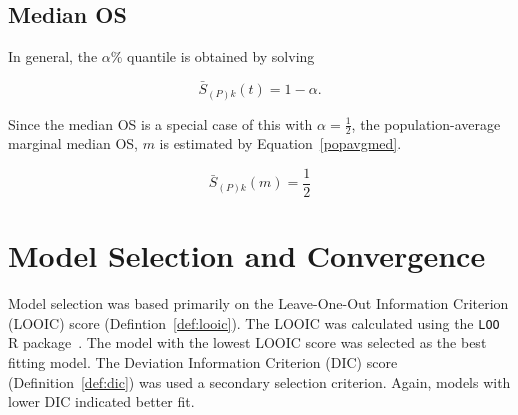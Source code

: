 \subsection{Median OS}
In general, the $\alpha\%$ quantile is obtained by solving

\begin{equation}
    \bar{S}_{(P)k}(t) = 1 - \alpha.
\end{equation}

Since the median OS is a special case of this with $\alpha = \frac{1}{2}$, the population-average marginal median OS, $m$ is estimated by Equation~\ref{popavgmed}. 

\begin{equation}
    \bar{S}_{(P)k}(m) = \frac{1}{2}
    \label{popavgmed}
\end{equation}

\section{Model Selection and Convergence}
Model selection was based primarily on the Leave-One-Out Information Criterion (LOOIC) score (Defintion~\ref{def:looic}). The LOOIC was calculated using the \verb|LOO| R package~\cite{loo}. The model with the lowest LOOIC score was selected as the best fitting model. The Deviation Information Criterion (DIC) score (Definition~\ref{def:dic}) was used a secondary selection criterion. Again, models with lower DIC indicated better fit. 